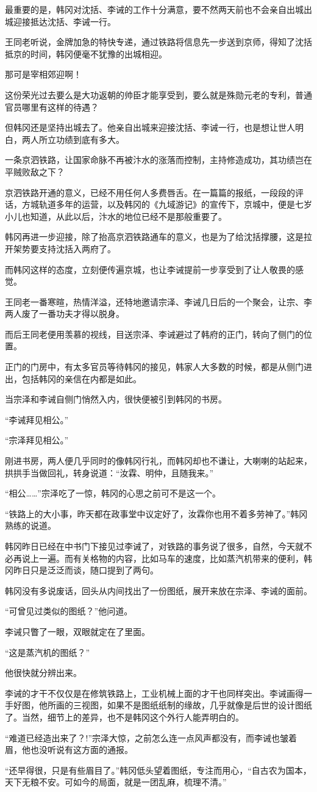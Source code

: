 最重要的是，韩冈对沈括、李诫的工作十分满意，要不然两天前也不会亲自出城出城迎接抵达沈括、李诫一行。

王同老听说，金牌加急的特快专递，通过铁路将信息先一步送到京师，得知了沈括抵京的时间，韩冈便毫不犹豫的出城相迎。

那可是宰相郊迎啊！

这份荣光过去要么是大功返朝的帅臣才能享受到，要么就是殊勋元老的专利，普通官员哪里有这样的待遇？

但韩冈还是坚持出城去了。他亲自出城来迎接沈括、李诫一行，也是想让世人明白，两人所立功绩到底有多大。

一条京泗铁路，让国家命脉不再被汴水的涨落而控制，主持修造成功，其功绩岂在平贼败敌之下？

京泗铁路开通的意义，已经不用任何人多费唇舌。在一篇篇的报纸，一段段的评话，方城轨道多年的运营，以及韩冈的《九域游记》的宣传下，京城中，便是七岁小儿也知道，从此以后，汴水的地位已经不是那般重要了。

韩冈再进一步迎接，除了抬高京泗铁路通车的意义，也是为了给沈括撑腰，这是拉开架势要支持沈括入两府了。

而韩冈这样的态度，立刻便传遍京城，也让李诫提前一步享受到了让人敬畏的感觉。

王同老一番寒暄，热情洋溢，还特地邀请宗泽、李诫几日后的一个聚会，让宗、李两人废了一番功夫才得以脱身。

而后王同老便用羡慕的视线，目送宗泽、李诫避过了韩府的正门，转向了侧门的位置。

正门的门房中，有太多官员等待韩冈的接见，韩家人大多数的时候，都是从侧门进出，包括韩冈的亲信在内都是如此。

当宗泽和李诫自侧门悄然入内，很快便被引到韩冈的书房。

“李诫拜见相公。”

“宗泽拜见相公。”

刚进书房，两人便几乎同时的像韩冈行礼，而韩冈却也不谦让，大喇喇的站起来，拱拱手当做回礼，转身说道：“汝霖、明仲，且随我来。”

“相公……”宗泽吃了一惊，韩冈的心思之前可不是这一个。

“铁路上的大小事，昨天都在政事堂中议定好了，汝霖你也用不着多劳神了。”韩冈熟练的说道。

韩冈昨日已经在中书门下接见过李诫了，对铁路的事务说了很多，自然，今天就不必再说上一遍。而有关格物的内容，比如马车的速度，比如蒸汽机带来的便利，韩冈昨日只是泛泛而谈，随口提到了两句。

韩冈没有多说废话，回头从内间找出了一份图纸，展开来放在宗泽、李诫的面前。

“可曾见过类似的图纸？”他问道。

李诫只瞥了一眼，双眼就定在了里面。

“这是蒸汽机的图纸？”

他很快就分辨出来。

李诫的才干不仅仅是在修筑铁路上，工业机械上面的才干也同样突出。李诫画得一手好图，他所画的三视图，如果不是图纸纸制的缘故，几乎就像是后世的设计图纸了。当然，细节上的差异，也不是韩冈这个外行人能弄明白的。

“难道已经造出来了？!”宗泽大惊，之前怎么连一点风声都没有，而李诫也皱着眉，他也没听说有这方面的通报。

“还早得很，只是有些眉目了。”韩冈低头望着图纸，专注而用心，“自古农为国本，天下无粮不安。可如今的局面，就是一团乱麻，梳理不清。”
